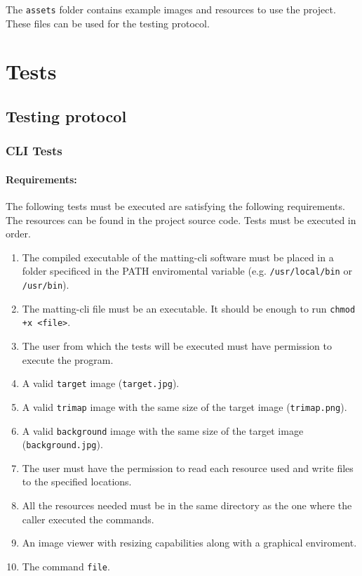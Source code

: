\documentclass[a4paper]{article}
\begin{document}
The \texttt{assets} folder contains
example images and resources to use the project.
These files can be used for the testing protocol.

\pagebreak

\section{Tests}

\subsection{Testing protocol}

\subsubsection{CLI Tests}

\paragraph{Requirements:}
The following tests must be executed are satisfying the
following requirements. The resources can be found in the project source code.
Tests must be executed in order.

\begin{enumerate}
    \item The compiled executable of the matting-cli software
    must be placed in a folder specificed in the \textsc{PATH}
    enviromental variable (e.g. \texttt{/usr/local/bin} or \texttt{/usr/bin}).
    \item The matting-cli file must be an executable. It should be enough to run
    \lstinline{chmod +x <file>}.
    \item The user from which the tests will be executed must have permission to execute
    the program.
    \item A valid \texttt{target} image (\texttt{target.jpg}).
    \item A valid \texttt{trimap} image with the same size of the target image (\texttt{trimap.png}).
    \item A valid \texttt{background} image with the same size of the target image (\texttt{background.jpg}).
    \item The user must have the permission to read each resource used and write files
    to the specified locations.
    \item All the resources needed must be in the same directory as the one where the caller executed the commands.
    \item An image viewer with resizing capabilities along with a graphical enviroment.
    \item The command \texttt{file}.
\end{enumerate}
\end{document}
